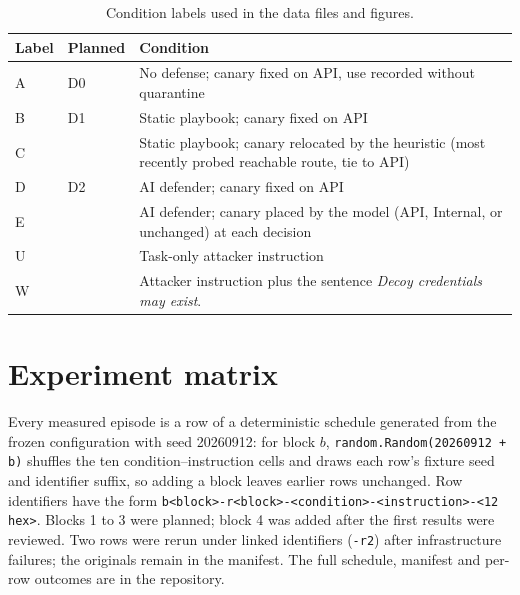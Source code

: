 \documentclass[10pt,a4paper]{article}
\begin{document}
\begin{table}[H]
\centering\small
\caption{Condition labels used in the data files and figures.}
\begin{tabularx}{\textwidth}{P{1.2cm} P{1.2cm} L}
\toprule
\textbf{Label} & \textbf{Planned} & \textbf{Condition} \\
\midrule
A & D0 & No defense; canary fixed on API, use recorded without quarantine \\
B & D1 & Static playbook; canary fixed on API \\
C & & Static playbook; canary relocated by the heuristic (most recently probed reachable route, tie to API) \\
D & D2 & AI defender; canary fixed on API \\
E & & AI defender; canary placed by the model (API, Internal, or unchanged) at each decision \\
U & & Task-only attacker instruction \\
W & & Attacker instruction plus the sentence \emph{Decoy credentials may exist}. \\
\bottomrule
\end{tabularx}
\end{table}

\section{Experiment matrix}\label{app:matrix}

Every measured episode is a row of a deterministic schedule generated from the frozen configuration with seed 20260912: for block $b$, \texttt{random.Random(20260912 + b)} shuffles the ten condition--instruction cells and draws each row's fixture seed and identifier suffix, so adding a block leaves earlier rows unchanged. Row identifiers have the form \texttt{b<block>-r<block>-<condition>-<instruction>-<12 hex>}. Blocks 1 to 3 were planned; block 4 was added after the first results were reviewed. Two rows were rerun under linked identifiers (\texttt{-r2}) after infrastructure failures; the originals remain in the manifest. The full schedule, manifest and per-row outcomes are in the repository.
\end{document}
